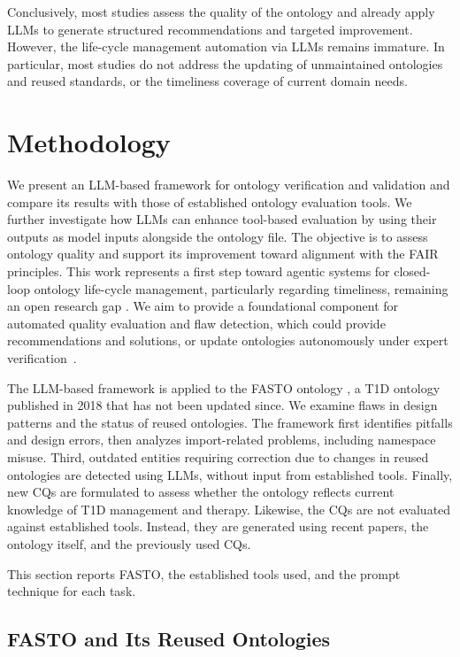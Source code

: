 \documentclass[
]{ceurart}
\begin{document}
Conclusively, most studies assess the quality of the ontology and already apply LLMs to generate structured recommendations and targeted improvement. However, the life-cycle management automation via LLMs remains immature. In particular, most studies do not address the updating of unmaintained ontologies and reused standards, or the timeliness coverage of current domain needs. 


\section{Methodology}
\label{sec:methods}

We present an LLM-based framework for ontology verification and validation and compare its results with those of established ontology evaluation tools. We further investigate how LLMs can enhance tool-based evaluation by using their outputs as model inputs alongside the ontology file. The objective is to assess ontology quality and support its improvement toward alignment with the FAIR principles. This work represents a first step toward agentic systems for closed-loop ontology life-cycle management, particularly regarding timeliness, remaining an open research gap \cite{li2025large}. We aim to provide a foundational component for automated quality evaluation and flaw detection, which could provide recommendations and solutions, or update ontologies autonomously under expert verification~\cite{Wilson2022}.

The LLM-based framework is applied to the FASTO ontology \cite{ElSappagh2019_FASTO}, a T1D ontology published in 2018 that has not been updated since. We examine flaws in design patterns and the status of reused ontologies. The framework first identifies pitfalls and design errors, then analyzes import-related problems, including namespace misuse. Third, outdated entities requiring correction due to changes in reused ontologies are detected using LLMs, without input from established tools. Finally, new CQs are formulated to assess whether the ontology reflects current knowledge of T1D management and therapy. Likewise, the CQs are not evaluated against established tools. Instead, they are generated using recent papers, the ontology itself, and the previously used CQs. 

This section reports FASTO, the established tools used, and the prompt technique for each task. 

\subsection{FASTO and Its Reused Ontologies}  
\end{document}
